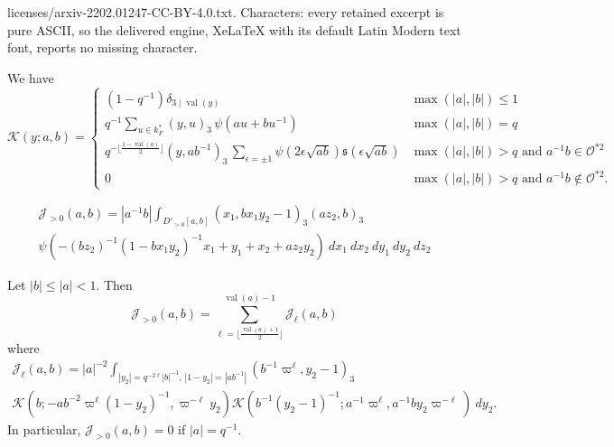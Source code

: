 \documentclass[10pt,a4paper]{amsart}
\newcommand{\J}{\mathcal{J}}
\newcommand{\Kl}{\mathcal{K}}
\newcommand{\abs}[1]{\left|{#1}\right|}
\newcommand{\sq}{\mathfrak{s}}
\newcommand{\val}{{\operatorname{val}}}
\renewcommand{\O}{\mathcal{O}}
\begin{document}
licenses/arxiv-2202.01247-CC-BY-4.0.txt. Characters: every retained excerpt is pure ASCII, so the delivered engine, XeLaTeX with its default Latin Modern text font, reports no missing character.
\begin{lemma}\label{lem kl int}
We have
\[
\Kl(y;a,b)=\begin{cases} (1-q^{-1})\delta_{3\mid \val(y)} & \max(\abs{a},\abs{b})\le 1 \\
q^{-1}\sum_{u\in k_F^*}(y,u)_3\,\psi(au+bu^{-1}) &  \max(\abs{a},\abs{b})=q \\
q^{-\lfloor\frac{1-\val(a)}2\rfloor}(y,ab^{-1})_3\,\sum_{\epsilon=\pm 1} \psi(2\epsilon\sqrt{ab})\sq(\epsilon\sqrt{ab})& \max(\abs{a},\abs{b})>q \text{ and }a^{-1}b\in \O^{*2} \\
0 & \max(\abs{a},\abs{b})>q \text{ and }a^{-1}b\not\in \O^{*2}.
 \end{cases}
\]
\end{lemma}

\begin{multline}\label{eq j>0}
\J_{>0}(a,b)=\abs{a^{-1}b}\int_{D'_{>0}[a,b]} (x_1,bx_1y_2-1)_3(az_2,b)_3\\ \psi(-(b z_2)^{-1}(1-bx_1y_2)^{-1}x_1+y_1+x_2+az_2y_2)\ dx_1\ dx_2\ dy_1\ dy_2\ dz_2
\end{multline}

\begin{lemma}\label{lem j>0}
Let $\abs{b}\le \abs{a}< 1$. Then
\[
\J_{>0}(a,b)=\sum_{\ell=\lfloor \frac{\val(a)+1}2\rfloor}^{\val(a)-1}\J_\ell(a,b)
\]
where
\begin{multline*}
\J_\ell(a,b)=\abs{a}^{-2}\int_{\abs{y_2}=q^{-2\ell}\abs{b}^{-1},\,\abs{1-y_2}=\abs{ab^{-1}}} (b^{-1}\varpi^\ell,y_2-1)_3\\ \Kl(b;-ab^{-2}\varpi^\ell(1-y_2)^{-1},\varpi^{-\ell} y_2)\Kl(b^{-1}(y_2-1)^{-1};a^{-1}\varpi^\ell ,a^{-1}by_2\varpi^{-\ell} )\ dy_2.
\end{multline*}
In particular, $\J_{>0}(a,b)=0$ if $\abs{a}=q^{-1}$.
\end{lemma}
\end{document}
